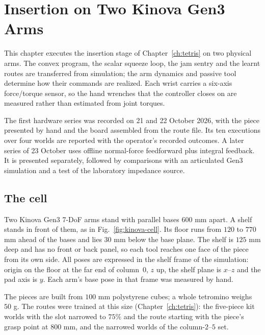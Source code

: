 \chapter{Insertion on Two Kinova Gen3 Arms}
\label{ch:kinova}

This chapter executes the insertion stage of Chapter~\ref{ch:tetris} on two physical arms. The convex program, the scalar squeeze loop, the jam sentry and the learnt routes are transferred from simulation; the arm dynamics and passive tool determine how their commands are realized. Each wrist carries a six-axis force/torque sensor, so the hand wrenches that the controller closes on are measured rather than estimated from joint torques.

The first hardware series was recorded on 21 and 22 October 2026, with the piece presented by hand and the board assembled from the route file. Its ten executions over four worlds are reported with the operator's recorded outcomes. A later series of 23 October uses offline normal-force feedforward plus integral feedback. It is presented separately, followed by comparisons with an articulated Gen3 simulation and a test of the laboratory impedance source.

\section{The cell}

Two Kinova Gen3 7-DoF arms stand with parallel bases $600$ mm apart. A shelf stands in front of them, as in Fig.~\ref{fig:kinova-cell}. Its floor runs from $120$ to $770$ mm ahead of the bases and lies $30$ mm below the base plane. The shelf is $125$ mm deep and has no front or back panel, so each tool reaches one face of the piece from its own side. All poses are expressed in the shelf frame of the simulation: origin on the floor at the far end of column~$0$, $z$ up, the shelf plane is $x$--$z$ and the pad axis is $y$. Each arm's base pose in that frame was measured by hand.


The pieces are built from $100$ mm polystyrene cubes; a whole tetromino weighs $50$ g. The routes were trained at this size (Chapter~\ref{ch:tetris}): the five-piece kit worlds with the slot narrowed to $75\%$ and the route starting with the piece's grasp point at $800$ mm, and the narrowed worlds of the column-$2$--$5$ set.

